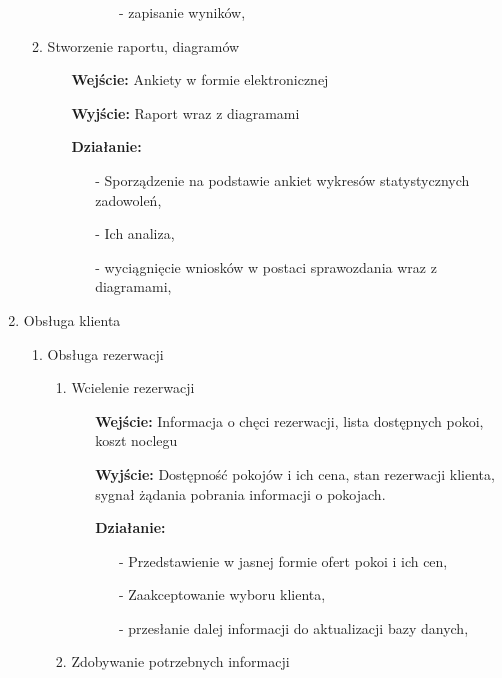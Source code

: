 \documentclass[a4paper, 11pt]{article}
\begin{document}
\begin{enumerate}[label*=\arabic*.]
\begin{enumerate}[label*=\arabic*.]
\begin{enumerate}[label*=\arabic*.]
\begin{itemize}
\begin{itemize}
						\item[-] zapisanie wyników,
					\end{itemize}					
				\end{itemize}	
			\end{enumerate}
			\item Stworzenie raportu, diagramów
			\begin{itemize}
				\item[\textbf{Wejście:}] Ankiety w formie elektronicznej
				\item[\textbf{Wyjście:}] Raport wraz z diagramami
				\item[\textbf{Działanie:}] 
				\begin{itemize}
					\item[-] Sporządzenie na podstawie ankiet wykresów statystycznych zadowoleń,
					\item[-] Ich analiza,
					\item[-] wyciągnięcie wniosków w postaci sprawozdania wraz z diagramami,
				\end{itemize}									
			\end{itemize}	
		\end{enumerate}
		\item Obsługa klienta
		\begin{enumerate}[label*=\arabic*.]
			\item Obsługa rezerwacji
			\begin{enumerate}[label*=\arabic*.]
				\item Wcielenie rezerwacji
				\begin{itemize}
					\item[\textbf{Wejście:}] Informacja o chęci rezerwacji, lista dostępnych pokoi, koszt noclegu
					\item[\textbf{Wyjście:}] Dostępność pokojów i ich cena, stan rezerwacji klienta, sygnał żądania pobrania informacji o pokojach.
					\item[\textbf{Działanie:}]
					\begin{itemize}
						\item[-] Przedstawienie w jasnej formie ofert pokoi i ich cen,
						\item[-] Zaakceptowanie wyboru klienta,
						\item[-] przesłanie dalej informacji do aktualizacji bazy danych,
					\end{itemize}									
				\end{itemize}	
				\item Zdobywanie potrzebnych informacji
				\begin{itemize}

\end{itemize}
\end{enumerate}
\end{enumerate}
\end{enumerate}
\end{document}
